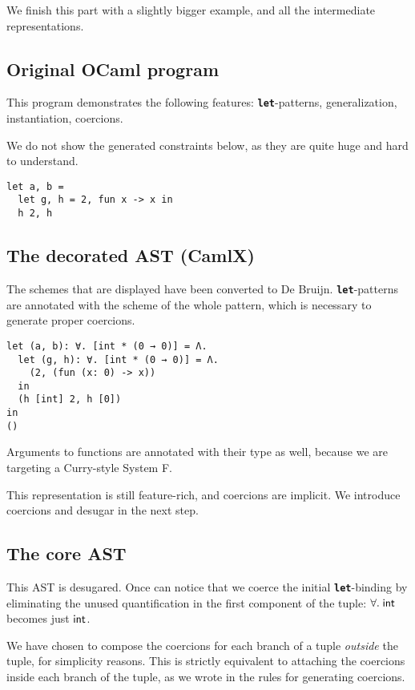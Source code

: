 \documentclass[10pt,a4paper,twoside,titlepage,twocolumn]{article}
\newcommand{\code}[1]{\textbf{\texttt{#1}}}
\begin{document}
We finish this part with a slightly bigger example, and all the intermediate
representations.

\subsection{Original OCaml program}

This program demonstrates the following features: \code{let}-patterns,
generalization, instantiation, coercions.

We do not show the generated constraints below, as they are quite huge and hard
to understand.

\begin{verbatim}
let a, b =
  let g, h = 2, fun x -> x in
  h 2, h
\end{verbatim}

\subsection{The decorated AST (CamlX)}

The schemes that are displayed have been converted to De Bruijn.
\code{let}-patterns are annotated with the scheme of the whole pattern, which is
necessary to generate proper coercions.

\begin{verbatim}
let (a, b): ∀. [int * (0 → 0)] = Λ.
  let (g, h): ∀. [int * (0 → 0)] = Λ.
    (2, (fun (x: 0) -> x))
  in
  (h [int] 2, h [0])
in
()
\end{verbatim}

Arguments to functions are annotated with their type as well, because we are
targeting a Curry-style System F.

This representation is still feature-rich, and coercions are implicit. We
introduce coercions and desugar in the next step.

\subsection{The core AST}

This AST is desugared. Once can notice that we coerce the initial
\code{let}-binding by eliminating the unused quantification in the first
component of the tuple: $\forall.\;\text{\textsf{int}}$ becomes just $\text{\textsf{int}}$.

We have chosen to compose the coercions for each branch of a tuple
\emph{outside} the tuple, for simplicity reasons. This is strictly equivalent to
attaching the coercions inside each branch of the tuple, as we wrote in the
rules for generating coercions.
\end{document}
